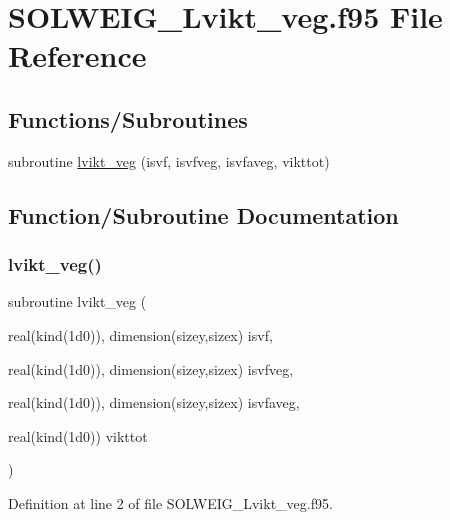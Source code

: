 \hypertarget{_s_o_l_w_e_i_g___lvikt__veg_8f95}{}\section{S\+O\+L\+W\+E\+I\+G\+\_\+\+Lvikt\+\_\+veg.\+f95 File Reference}
\label{_s_o_l_w_e_i_g___lvikt__veg_8f95}
\subsection*{Functions/\+Subroutines}
\begin{DoxyCompactItemize}
\item 
subroutine \hyperlink{_s_o_l_w_e_i_g___lvikt__veg_8f95_a74f067d7dbe5ab845f83f3ba109a0b62}{lvikt\+\_\+veg} (isvf, isvfveg, isvfaveg, vikttot)
\end{DoxyCompactItemize}


\subsection{Function/\+Subroutine Documentation}
\mbox{\label{_s_o_l_w_e_i_g___lvikt__veg_8f95_a74f067d7dbe5ab845f83f3ba109a0b62}} 
\subsubsection{\texorpdfstring{lvikt\+\_\+veg()}{lvikt\_veg()}}
{\footnotesize\ttfamily subroutine lvikt\+\_\+veg (\begin{DoxyParamCaption}\item[{real(kind(1d0)), dimension(sizey,sizex)}]{isvf,  }\item[{real(kind(1d0)), dimension(sizey,sizex)}]{isvfveg,  }\item[{real(kind(1d0)), dimension(sizey,sizex)}]{isvfaveg,  }\item[{real(kind(1d0))}]{vikttot }\end{DoxyParamCaption})}



Definition at line 2 of file S\+O\+L\+W\+E\+I\+G\+\_\+\+Lvikt\+\_\+veg.\+f95.

